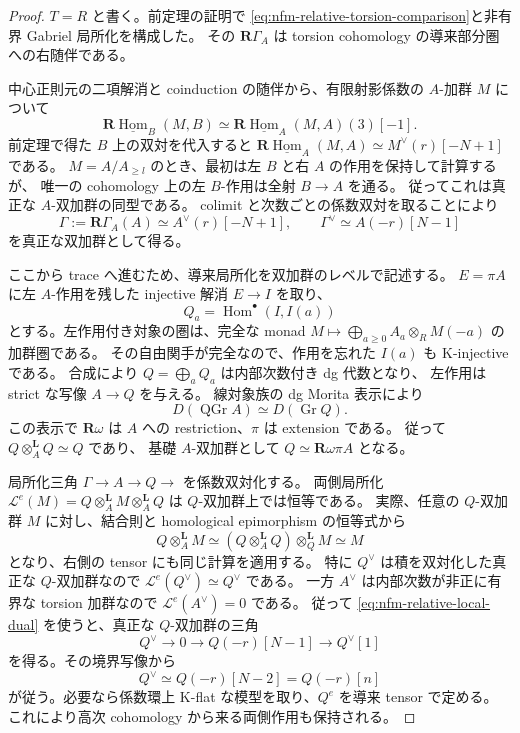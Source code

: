 \begin{proof}
$T=R$ と書く。前定理の証明で
\eqref{eq:nfm-relative-torsion-comparison}と非有界 Gabriel 局所化を構成した。
その $\mathbf R\Gamma_A$ は torsion cohomology の導来部分圏への右随伴である。

中心正則元の二項解消と coinduction の随伴から、有限射影係数の $A$-加群 $M$ について
\[
 \mathbf R\underline{\operatorname{Hom}}_B(M,B)
 \simeq\mathbf R\underline{\operatorname{Hom}}_A(M,A)(3)[-1].
\]
前定理で得た $B$ 上の双対を代入すると
$\mathbf R\underline{\operatorname{Hom}}_A(M,A)
 \simeq M^\vee(r)[-N+1]$ である。
$M=A/A_{\geq l}$ のとき、最初は左 $B$ と右 $A$ の作用を保持して計算するが、
唯一の cohomology 上の左 $B$-作用は全射 $B\to A$ を通る。
従ってこれは真正な $A$-双加群の同型である。
colimit と次数ごとの係数双対を取ることにより
\begin{equation}
\label{eq:nfm-relative-local-dual}
 \Gamma:=\mathbf R\Gamma_A(A)\simeq A^\vee(r)[-N+1],\qquad
 \Gamma^\vee\simeq A(-r)[N-1]
\end{equation}
を真正な双加群として得る。

ここから trace へ進むため、導来局所化を双加群のレベルで記述する。
$E=\pi A$ に左 $A$-作用を残した injective 解消 $E\to I$ を取り、
\[
 Q_a=\operatorname{Hom}^{\bullet}(I,I(a))
\]
とする。左作用付き対象の圏は、完全な monad
$M\mapsto\bigoplus_{a\geq0}A_a\otimes_RM(-a)$ の加群圏である。
その自由関手が完全なので、作用を忘れた $I(a)$ も K-injective である。
合成により $Q=\bigoplus_aQ_a$ は内部次数付き dg 代数となり、
左作用は strict な写像 $A\to Q$ を与える。
線対象族の dg Morita 表示\cite[Theorem~3.8(c)]{NFMKellerDg}により
\[
 D(\operatorname{QGr}A)\simeq D(\operatorname{Gr}Q).
\]
この表示で $\mathbf R\omega$ は $A$ への restriction、$\pi$ は extension である。
従って $Q\otimes_A^{\mathbf L}Q\simeq Q$ であり、
基礎 $A$-双加群として $Q\simeq\mathbf R\omega\pi A$ となる。

局所化三角 $\Gamma\to A\to Q\to$ を係数双対化する。
両側局所化 $\mathcal L^e(M)=Q\otimes_A^{\mathbf L}M\otimes_A^{\mathbf L}Q$ は
$Q$-双加群上では恒等である。
実際、任意の $Q$-双加群 $M$ に対し、結合則と homological epimorphism の恒等式から
\[
 Q\otimes_A^{\mathbf L}M
 \simeq(Q\otimes_A^{\mathbf L}Q)\otimes_Q^{\mathbf L}M
 \simeq M
\]
となり、右側の tensor にも同じ計算を適用する。
特に $Q^\vee$ は積を双対化した真正な $Q$-双加群なので
$\mathcal L^e(Q^\vee)\simeq Q^\vee$ である。
一方 $A^\vee$ は内部次数が非正に有界な torsion 加群なので
$\mathcal L^e(A^\vee)=0$ である。
従って \eqref{eq:nfm-relative-local-dual} を使うと、真正な $Q$-双加群の三角
\[
 Q^\vee\longrightarrow0\longrightarrow Q(-r)[N-1]
 \longrightarrow Q^\vee[1]
\]
を得る。その境界写像から
\[
 Q^\vee\simeq Q(-r)[N-2]=Q(-r)[n]
\]
が従う。必要なら係数環上 K-flat な模型を取り、$Q^e$ を導来 tensor で定める。
これにより高次 cohomology から来る両側作用も保持される。


\end{proof}
